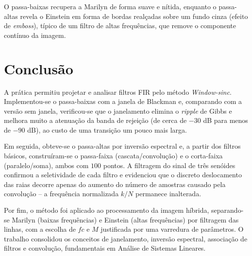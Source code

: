 \documentclass[12pt,a4paper]{article}
\begin{document}
O passa-baixas recupera a Marilyn de forma suave e n\'itida, enquanto o passa-altas
revela o Einstein em forma de bordas realçadas sobre um fundo cinza (efeito de
\textit{emboss}), t\'ipico de um filtro de altas frequ\^encias, que remove o
componente cont\'inuo da imagem.

\section*{Conclus\~ao}

A pr\'atica permitiu projetar e analisar filtros FIR pelo m\'etodo
\textit{Window-sinc}. Implementou-se o passa-baixas com a janela de Blackman e,
comparando com a vers\~ao sem janela, verificou-se que o janelamento elimina o
\textit{ripple} de Gibbs e melhora muito a atenua\c{c}\~ao da banda de
rejei\c{c}\~ao (de cerca de $-30$ dB para menos de $-90$ dB), ao custo de uma
transi\c{c}\~ao um pouco mais larga.

Em seguida, obteve-se o passa-altas por invers\~ao espectral e, a partir dos
filtros b\'asicos, constru\'iram-se o passa-faixa (cascata/convolu\c{c}\~ao) e o
corta-faixa (paralelo/soma), ambos com $100$ pontos. A filtragem do sinal de tr\^es
sen\'oides confirmou a seletividade de cada filtro e evidenciou que o discreto
deslocamento das raias decorre apenas do aumento do n\'umero de amostras causado pela
convolu\c{c}\~ao -- a frequ\^encia normalizada $k/N$ permanece inalterada.

Por fim, o m\'etodo foi aplicado ao processamento da imagem h\'ibrida, separando-se
Marilyn (baixas frequ\^encias) e Einstein (altas frequ\^encias) por filtragem das
linhas, com a escolha de $fc$ e $M$ justificada por uma varredura de par\^ametros. O
trabalho consolidou os conceitos de janelamento, invers\~ao espectral, associa\c{c}\~ao
de filtros e convolu\c{c}\~ao, fundamentais em An\'alise de Sistemas Lineares.
\end{document}
